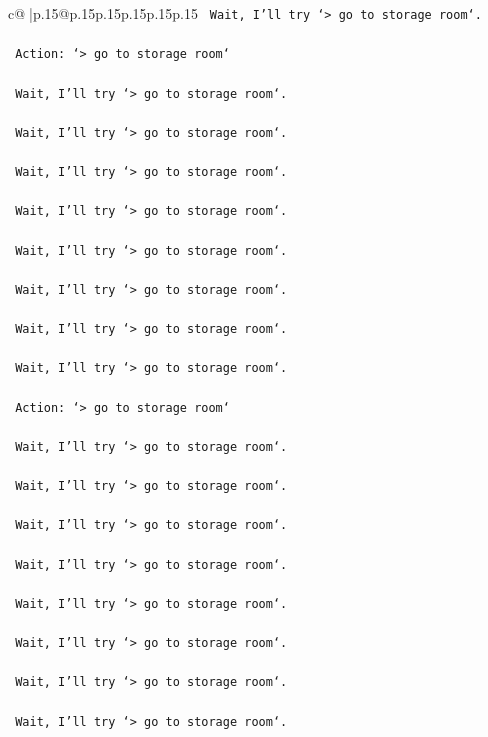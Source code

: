 \documentclass{article}
\begin{document}
{\begin{supertabular}{c@{$\;$}|p{.15\linewidth}@{}p{.15\linewidth}p{.15\linewidth}p{.15\linewidth}p{.15\linewidth}p{.15\linewidth}}
{{{\texttt{    Wait, I'll try `> go to storage room`.} \\
\\ 
\texttt{    Action: `> go to storage room`} \\
\\ 
\texttt{    Wait, I'll try `> go to storage room`.} \\
\\ 
\texttt{    Wait, I'll try `> go to storage room`.} \\
\\ 
\texttt{    Wait, I'll try `> go to storage room`.} \\
\\ 
\texttt{    Wait, I'll try `> go to storage room`.} \\
\\ 
\texttt{    Wait, I'll try `> go to storage room`.} \\
\\ 
\texttt{    Wait, I'll try `> go to storage room`.} \\
\\ 
\texttt{    Wait, I'll try `> go to storage room`.} \\
\\ 
\texttt{    Wait, I'll try `> go to storage room`.} \\
\\ 
\texttt{    Action: `> go to storage room`} \\
\\ 
\texttt{    Wait, I'll try `> go to storage room`.} \\
\\ 
\texttt{    Wait, I'll try `> go to storage room`.} \\
\\ 
\texttt{    Wait, I'll try `> go to storage room`.} \\
\\ 
\texttt{    Wait, I'll try `> go to storage room`.} \\
\\ 
\texttt{    Wait, I'll try `> go to storage room`.} \\
\\ 
\texttt{    Wait, I'll try `> go to storage room`.} \\
\\ 
\texttt{    Wait, I'll try `> go to storage room`.} \\
\\ 
\texttt{    Wait, I'll try `> go to storage room`.} \\
\\ 
}}}
\end{supertabular}}
\end{document}

